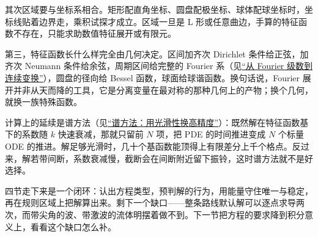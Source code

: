 其次区域要与坐标系相合。矩形配直角坐标、圆盘配极坐标、球体配球坐标时，坐标线贴着边界走，乘积试探才成立。区域一旦是 L 形或任意曲边，手算的特征函数不存在，只能求助数值特征展开或有限元。

第三，特征函数长什么样完全由几何决定。区间加齐次 Dirichlet 条件给正弦，加齐次 Neumann 条件给余弦，周期区间给完整的 Fourier 系（见\hyperref[sec:08-Numerical-Analysis/08-Fourier-and-Spectral-Methods/01]{``从 Fourier 级数到连续变换''}），圆盘的径向给 Bessel 函数，球面给球谐函数。换句话说，Fourier 展开并非从天而降的工具，它是分离变量在最对称的那种几何上的产物；换个几何，就换一族特殊函数。

计算上的延续是谱方法（见\hyperref[sec:08-Numerical-Analysis/08-Fourier-and-Spectral-Methods/04]{``谱方法：用光滑性换高精度''}）：既然解在特征函数基下的系数随 \(k\) 快速衰减，那就只留前 \(N\) 项，把 PDE 的时间推进变成 \(N\) 个标量 ODE 的推进。解足够光滑时，几十个基函数能顶得上有限差分上千个格点。反过来，解若带间断，系数衰减慢，截断会在间断附近留下振铃，这时谱方法就不是好选择。

四节走下来是一个闭环：认出方程类型，预判解的行为，用能量守住唯一与稳定，再在规则区域上把解算出来。剩下一个缺口——整条路线默认解可以逐点求导两次，而带尖角的波、带激波的流体明摆着做不到。下一节把方程的要求降到积分意义上，看看这个缺口怎么补。
